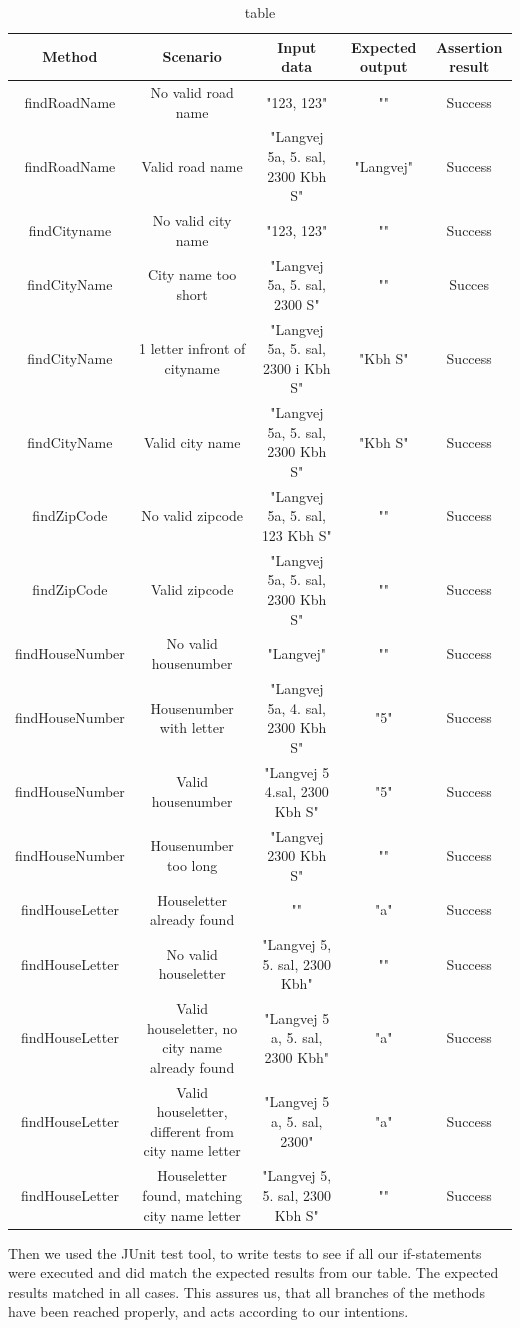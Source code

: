 \documentclass[a4paper,10pt,titlepage]{article}
\begin{document}
\begin{landscape}
\begin{table}
\caption{table}
\centering
\begin{tabular}{c c c c c}
Method & Scenario & Input data & Expected output & Assertion result \\ [0.5ex] 
\hline
findRoadName & No valid road name & "123, 123" & "" & Success\\
findRoadName & Valid road name & "Langvej 5a, 5. sal, 2300 Kbh S" & "Langvej" & Success \\
findCityname & No valid city name & "123, 123" & "" & Success \\
findCityName & City name too short & "Langvej 5a, 5. sal, 2300 S" & "" & Succes\\
findCityName & 1 letter infront of cityname & "Langvej 5a, 5. sal, 2300 i Kbh S" & "Kbh S" & Success \\
findCityName & Valid city name & "Langvej 5a, 5. sal, 2300 Kbh S" & "Kbh S" & Success \\
findZipCode & No valid zipcode & "Langvej 5a, 5. sal, 123 Kbh S" & "" & Success \\
findZipCode & Valid zipcode & "Langvej 5a, 5. sal, 2300 Kbh S" & "" & Success \\
findHouseNumber & No valid housenumber & "Langvej" & "" & Success \\
findHouseNumber &  Housenumber with letter & "Langvej 5a, 4. sal, 2300 Kbh S" & "5" & Success \\
findHouseNumber & Valid housenumber & "Langvej 5 4.sal, 2300 Kbh S" & "5" & Success \\
findHouseNumber & Housenumber too long & "Langvej 2300 Kbh S" & "" & Success \\
findHouseLetter & Houseletter already found & "" & "a" & Success \\
findHouseLetter & No valid houseletter & "Langvej 5, 5. sal, 2300 Kbh" & "" & Success \\
findHouseLetter & Valid houseletter, no city name already found & "Langvej 5 a, 5. sal, 2300 Kbh" & "a" & Success \\
findHouseLetter & Valid houseletter, different from city name letter & "Langvej 5 a, 5. sal, 2300" & "a" & Success \\
findHouseLetter & Houseletter found, matching city name letter & "Langvej 5, 5. sal, 2300 Kbh S" & "" & Success



\end{tabular}
\end{table}
\end{landscape}
Then we used the JUnit test tool, to write tests to see if all our if-statements were executed and did match the expected results from our table. The expected results matched in all cases. This assures us, that all branches of the methods have been reached properly, and acts according to our intentions.
\end{document}
